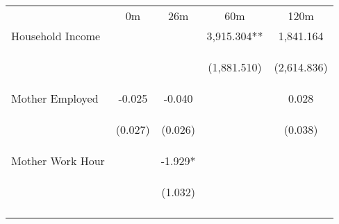 \begin{tabular}{lcccc}
\hline \noalign{\smallskip} & 0m & 26m & 60m & 120m\\
\noalign{\smallskip}\hline \noalign{\smallskip}Household Income &  &  & 3,915.304** & 1,841.164\\
 & \begin{footnotesize}\end{footnotesize} & \begin{footnotesize}\end{footnotesize} & \begin{footnotesize}(1,881.510)\end{footnotesize} & \begin{footnotesize}(2,614.836)\end{footnotesize}\\
\noalign{\smallskip}Mother Employed & -0.025 & -0.040 &  & 0.028\\
 & \begin{footnotesize}(0.027)\end{footnotesize} & \begin{footnotesize}(0.026)\end{footnotesize} & \begin{footnotesize}\end{footnotesize} & \begin{footnotesize}(0.038)\end{footnotesize}\\
\noalign{\smallskip}Mother Work Hour &  & -1.929* &  & \\
 & \begin{footnotesize}\end{footnotesize} & \begin{footnotesize}(1.032)\end{footnotesize} & \begin{footnotesize}\end{footnotesize} & \begin{footnotesize}\end{footnotesize}\\
\noalign{\smallskip}\hline\end{tabular}\\
